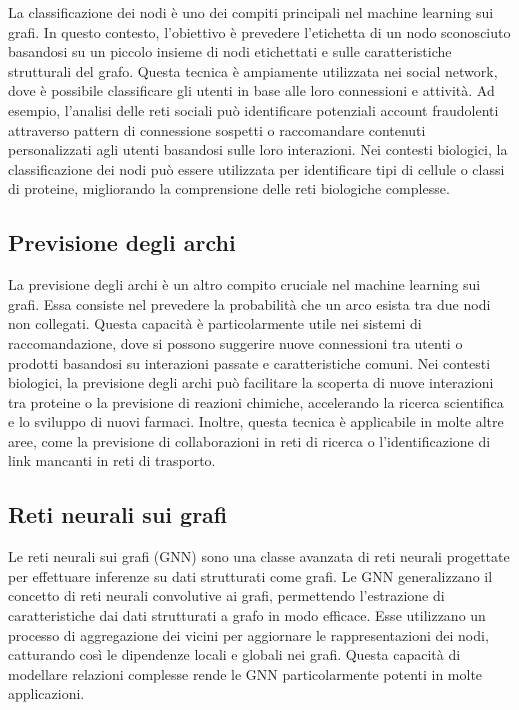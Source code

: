 \documentclass{article}
\begin{document}
La classificazione dei nodi è uno dei compiti principali nel machine learning sui grafi. In questo contesto, l'obiettivo è prevedere l'etichetta di un nodo sconosciuto basandosi su un piccolo insieme di nodi etichettati e sulle caratteristiche strutturali del grafo. Questa tecnica è ampiamente utilizzata nei social network, dove è possibile classificare gli utenti in base alle loro connessioni e attività. Ad esempio, l'analisi delle reti sociali può identificare potenziali account fraudolenti attraverso pattern di connessione sospetti o raccomandare contenuti personalizzati agli utenti basandosi sulle loro interazioni. Nei contesti biologici, la classificazione dei nodi può essere utilizzata per identificare tipi di cellule o classi di proteine, migliorando la comprensione delle reti biologiche complesse.

\subsection{Previsione degli archi}

La previsione degli archi è un altro compito cruciale nel machine learning sui grafi. Essa consiste nel prevedere la probabilità che un arco esista tra due nodi non collegati. Questa capacità è particolarmente utile nei sistemi di raccomandazione, dove si possono suggerire nuove connessioni tra utenti o prodotti basandosi su interazioni passate e caratteristiche comuni. Nei contesti biologici, la previsione degli archi può facilitare la scoperta di nuove interazioni tra proteine o la previsione di reazioni chimiche, accelerando la ricerca scientifica e lo sviluppo di nuovi farmaci. Inoltre, questa tecnica è applicabile in molte altre aree, come la previsione di collaborazioni in reti di ricerca o l'identificazione di link mancanti in reti di trasporto.

\subsection{Reti neurali sui grafi}

Le reti neurali sui grafi (GNN) sono una classe avanzata di reti neurali progettate per effettuare inferenze su dati strutturati come grafi. Le GNN generalizzano il concetto di reti neurali convolutive ai grafi, permettendo l'estrazione di caratteristiche dai dati strutturati a grafo in modo efficace. Esse utilizzano un processo di aggregazione dei vicini per aggiornare le rappresentazioni dei nodi, catturando così le dipendenze locali e globali nei grafi. Questa capacità di modellare relazioni complesse rende le GNN particolarmente potenti in molte applicazioni.
\end{document}
